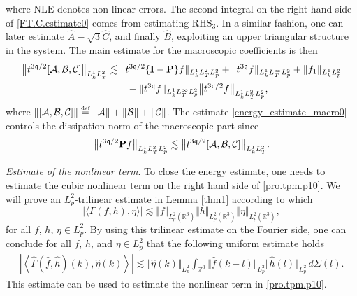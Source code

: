 \documentclass[reqno]{amsart}
\newcommand{\eqdef }{\overset{\mbox{\tiny{def}}}{=}}
\newcommand{\pv}{p}
\def\norm#1{\big\Vert#1\big\Vert}
\newcommand{\irnp}[2]{\left\langle {#1},{#2} \right\rangle}
\newcommand{\threed}{{\mathbb R}^3}
\newcommand{\qq}{\mathfrak{q}}
\newcommand{\tTq}{t^{3\qq}}
\newcommand{\macro}{{\bf P}}
\newcommand{\micro}{{\bf \{I- P\}}}
\newcommand{\Z}{\mathbb{Z}}
\theoremstyle{definition}
\numberwithin{equation}{section}
\numberwithin{theorem}{section}
\begin{document}
where \(\mathrm{NLE}\) denotes non-linear errors. The second integral on the right hand side of \eqref{FT.C.estimate0} comes from estimating \(\mathrm{RHS}_3\).
In a similar fashion, one can later estimate \(\widehat{A}-\sqrt{3}\widehat{C}\), and finally \(\widehat{B}\), exploiting an upper triangular structure in the system. The main estimate for the macroscopic coefficients is then 
\begin{equation}\label{energy_estimate_macro0}
\begin{split}
\norm{t^{3\qq/2} [\mathcal{A},\mathcal{B},\mathcal{C}]}_{L^1_k L^2_T} &\lesssim
\Vert t^{3\qq/2}\micro f \Vert_{L^1_k L^2_T L^2_{\pv}} +\Vert \tTq f \Vert_{L^1_k L^\infty_T L^2_{\pv}} + \Vert f_1 \Vert_{L^1_k L^2_{\pv}} \\ 
&\qquad+ {\Vert{\tTq f}\Vert_{L^1_kL^\infty_TL^2_{\pv}}} {\norm{t^{3\qq/2} f}_{L^1_kL^2_TL^2_{\pv}}}, 
\end{split}
\end{equation}
where \(\| [\mathcal{A},\mathcal{B},\mathcal{C}]\|\eqdef\| \mathcal{A}\|+\| \mathcal{B}\|+\| \mathcal{C}\|\). The estimate \eqref{energy_estimate_macro0} controls the dissipation norm of the macroscopic part since 
\begin{equation}\label{ineq:macrodiss}
\norm{t^{3\qq/2} \macro f}_{L^1_k L^2_TL^2_p}\lesssim 
\norm{t^{3\qq/2} [\mathcal{A},\mathcal{B},\mathcal{C}]}_{L^1_k L^2_T} .    
\end{equation}


\textit{Estimate of the nonlinear term}. To close the energy estimate, one needs to estimate the cubic nonlinear term on the right hand side of \eqref{pro.tpm.p10}. We will prove an \(L^2_p\)-trilinear estimate in Lemma \ref{thm1} according to which
\[
	 |\langle  \Gamma(f,h),\eta\rangle| \lesssim \norm{ f}_{L^2_p(\threed)}\norm{ h}_{L^2_p(\threed)}\norm{ \eta}_{L^2_p(\threed)},
\]
for all \(f\), \(h\), \(\eta\in L^2_p\). By using this trilinear estimate on the Fourier side, one can conclude for all \(f\), \(h\), and \(\eta\in L^2_p\) that the following uniform estimate holds
\begin{align}\label{ineq: Boltzmann nonlinear00}
\left| \irnp{\widehat{\Gamma}(\hat{f},\hat{h})(k)}{\hat{\eta}(k)}\right|\lesssim \norm{\hat{\eta}(k)}_{L^2_{\pv}}\int_{\Z^3}\Vert \hat{f}(k-l)\Vert_{L^2_{\pv}} \norm{\hat{h}(l)}_{L^2_{\pv}}  \,d\Sigma(l).
\end{align}
This estimate can be used to estimate the nonlinear term in \eqref{pro.tpm.p10}.
\end{document}
